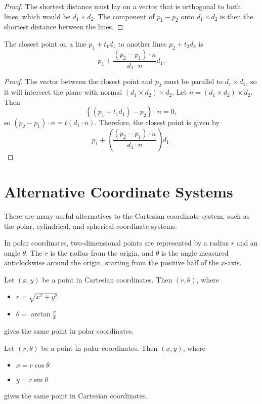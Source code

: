 \begin{proof}
    The shortest distance must lay on a vector that is orthogonal to both lines, which would be $d_1 \times d_2$. The component of $p_1 - p_2$ onto $d_1 \times d_2$ is then the shortest distance between the lines.
\end{proof}

\begin{thm}
    The closest point on a line $p_1 + t_1d_1$ to another lines $p_2 + t_2d_2$ is \[p_1 + \frac{(p_2 - p_1)\cdot n}{d_1 \cdot n}d_1.\]
\end{thm}

\begin{proof}
    The vector between the closest point and $p_2$ must be parallel to $d_1 \times d_2$, so it will intersect the plane with normal $(d_1 \times d_2) \times d_2$. Let $n = (d_1 \times d_2) \times d_2$. Then \[\left\{(p_1 + t_1d_1) - p_2\right\} \cdot n = 0,\] so $(p_2 - p_1)\cdot n = t(d_1 \cdot n)$. Therefore, the closest point is given by \[p_1 + \left(\frac{(p_2 - p_1)\cdot n}{d_1 \cdot n}\right)d_1.\]
\end{proof}

\section{Alternative Coordinate Systems}

There are many useful alternatives to the Cartesian coordinate system, such as the polar, cylindrical, and spherical coordinate systems.

In polar coordinates, two-dimensional points are represented by a radius $r$ and an angle $\theta$. The $r$ is the radius from the origin, and $\theta$ is the angle measured anticlockwise around the origin, starting from the positive half of the $x$-axis.

\begin{thm}
    Let $(x, y)$ be a point in Cartesian coordinates. Then $(r, \theta)$, where
    \begin{itemize}
        \item $r = \sqrt{x^2 + y^2}$
        \item $\theta = \arctan\frac{y}{x}$
    \end{itemize} gives the same point in polar coordinates.
\end{thm}

\begin{thm}
    Let $(r, \theta)$ be a point in polar coordinates. Then $(x, y)$, where
    \begin{itemize}
        \item $x = r\cos\theta$
        \item $y = r\sin\theta$
    \end{itemize} gives the same point in Cartesian coordinates.
\end{thm}

